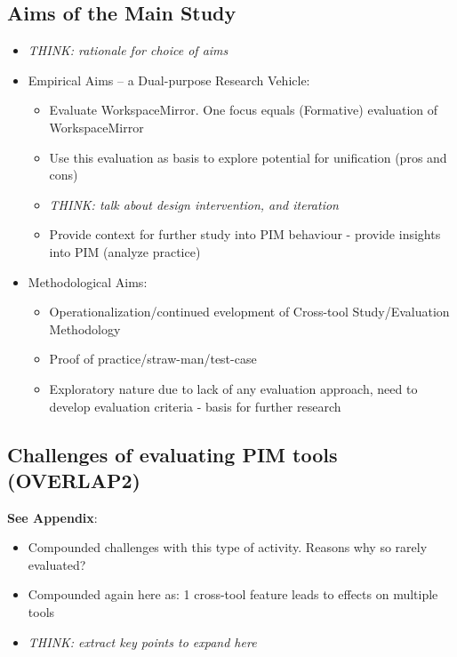 \subsection{Aims of the Main Study}
\begin{itemize}
	\item \textit{THINK: rationale for choice of aims}
	\item Empirical Aims -- a Dual-purpose Research Vehicle:
	\begin{itemize}
		\item Evaluate WorkspaceMirror. One focus equals (Formative) evaluation of WorkspaceMirror
		\item Use this evaluation as basis to explore potential for unification (pros and cons)
		\item \textit{THINK: talk about design intervention, and iteration}
		\item Provide context for further study into PIM behaviour - provide insights into PIM (analyze practice)
	\end{itemize}

	\item Methodological Aims:
	\begin{itemize}
		\item Operationalization/continued evelopment of Cross-tool Study/Evaluation Methodology
		\item Proof of practice/straw-man/test-case
		\item Exploratory nature due to lack of any evaluation approach, need to develop evaluation criteria - basis for further research
	\end{itemize}
	
\end{itemize}


\subsection{Challenges of evaluating PIM tools (OVERLAP2)}

\textbf{See Appendix}:
\begin{itemize}
	\item Compounded challenges with this type of activity. Reasons why so rarely evaluated?
	\item Compounded again here as: 1 cross-tool feature leads to effects on multiple tools
	\item \textit{THINK: extract key points to expand here}
\end{itemize}



